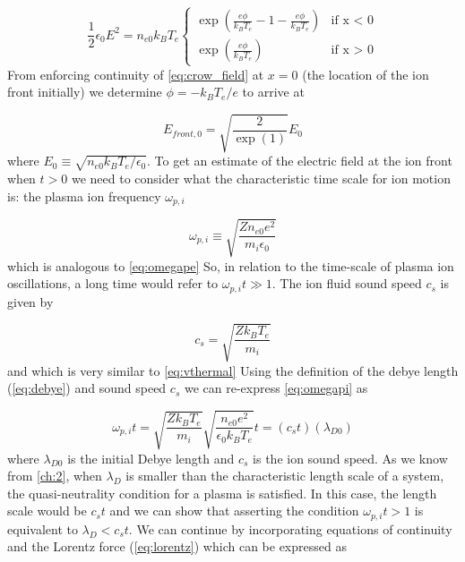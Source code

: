 \begin{equation}
	\frac{1}{2} \epsilon_0 E^2 = n_{e0} k_B T_e
	\begin{cases}
		\exp(\frac{e \phi}{k_B T_e} - 1 - \frac{e \phi}{k_B T_e}) & \mbox{if x < 0} \\
		\exp(\frac{e \phi}{k_B T_e}) & \mbox{if x > 0} \label{eq:crow_field}
	\end{cases}
\end{equation} 
From enforcing continuity of \cref{eq:crow_field} at $x=0$ (the location of the ion front initially) we determine $\phi = -k_B T_e / e$ to arrive at  

\begin{equation}
	E_{front,0} = \sqrt{\frac{2}{\exp(1)}} E_0
\end{equation}
where $E_0 \equiv \sqrt{n_{e0} k_B T_e / \epsilon_0}$. To get an estimate of the electric field at the ion front when $t > 0$ we need to consider what the characteristic time scale for ion motion is: the plasma ion frequency $\omega_{p,i}$

\begin{equation}
	\omega_{p,i} \equiv \sqrt{\frac{Z n_{e0} e^2}{m_i \epsilon_0}}	\label{eq:omegapi}
\end{equation} 
which is analogous to \cref{eq:omegape} So, in relation to the time-scale of plasma ion oscillations, a long time would refer to $\omega_{p,i} t \gg 1$. The ion fluid sound speed $c_s$ is given by 

\begin{equation}
	c_s = \sqrt{\frac{Z k_B T_e}{m_i}} \label{eq:soundspeed}
\end{equation}
and which is very similar to \cref{eq:vthermal} Using the definition of the debye length (\cref{eq:debye}) and sound speed $c_s$ we can re-express \cref{eq:omegapi} as 

\begin{equation}
	\omega_{p,i} t = \sqrt{\frac{Z k_B T_e}{m_i}} \sqrt{\frac{n_{e0} e^2}{\epsilon_0 k_B T_e}} t = (c_s t) (\lambda_{D0})
\end{equation}
where $\lambda_{D0}$ is the initial Debye length and $c_s$ is the ion sound speed. As we know from \cref{ch:2}, when $\lambda_D$ is smaller than the characteristic length scale of a system, the quasi-neutrality condition for a plasma is satisfied. In this case, the length scale would be $c_s t$ and we can show that asserting the condition $\omega_{p,i} t > 1$ is equivalent to $\lambda_D < c_s t$. We can continue by incorporating equations of continuity and the Lorentz force (\cref{eq:lorentz}) which can be expressed as 

